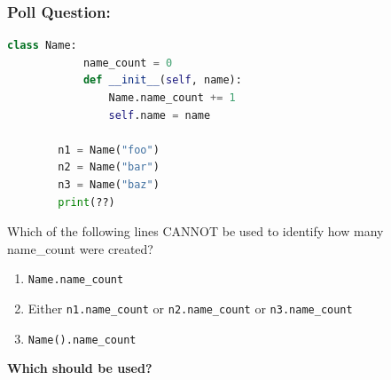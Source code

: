 \documentclass{beamer}
\begin{document}
%
%
%
\begin{frame}[fragile]
    \frametitle{Poll Question: }
    \begin{minipage}{0.49\textwidth}
        \begin{lstlisting}[language=Python, autogobble]
        class Name:
            name_count = 0
            def __init__(self, name):
                Name.name_count += 1
                self.name = name

        n1 = Name("foo")
        n2 = Name("bar")
        n3 = Name("baz")
        print(??)
        \end{lstlisting}
    \end{minipage}
    \hfill
    \begin{minipage}{0.49\textwidth}
        Which of the following lines CANNOT be used to identify how many name\_count were created?
        \begin{enumerate}[A]
            \item \lstinline|Name.name_count|
            \item Either \lstinline|n1.name_count| or \lstinline|n2.name_count| or \lstinline|n3.name_count|
            \item \lstinline|Name().name_count|
        \end{enumerate}
    \end{minipage}
    \vfill
    \textbf{Which should be used?}
\end{frame}
\end{document}
